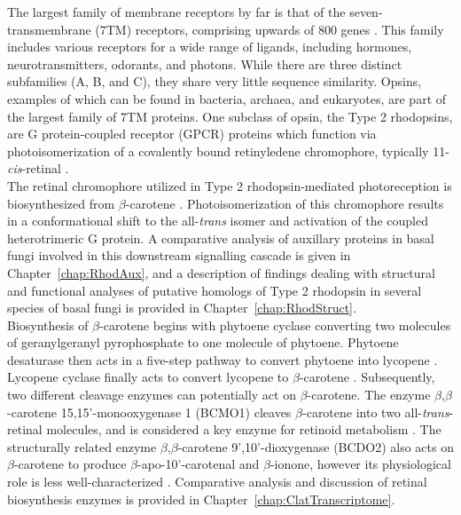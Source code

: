 \indent The largest family of membrane receptors by far is that of the seven-transmembrane (7TM) receptors, comprising upwards of 800 genes \cite{Pierce2002}. This family includes various receptors for a wide range of ligands, including hormones, neurotransmitters, odorants, and photons. While there are three distinct subfamilies (A, B, and C), they share very little sequence similarity. Opsins, examples of which can be found in bacteria, archaea, and eukaryotes, are part of the largest family of 7TM proteins. One subclass of opsin, the Type 2 rhodopsins, are G protein-coupled receptor (GPCR) proteins which function via photoisomerization of a covalently bound retinyledene chromophore, typically 11-\textit{cis}-retinal \cite{Wald1968}.\\
\indent The retinal chromophore utilized in Type 2 rhodopsin-mediated photoreception is biosynthesized from $\beta$-carotene \cite{VonLintig2000}. Photoisomerization of this chromophore results in a conformational shift to the all-\textit{trans} isomer \cite{Smith2010} and activation of the coupled heterotrimeric G protein. A comparative analysis of auxillary proteins in basal fungi involved in this downstream signalling cascade is given in Chapter~\ref{chap:RhodAux}, and a description of findings dealing with structural and functional analyses of putative homologs of Type 2 rhodopsin in several species of basal fungi is provided in Chapter~\ref{chap:RhodStruct}.\\
\indent Biosynthesis of $\beta$-carotene begins with phytoene cyclase
converting two molecules of geranylgeranyl pyrophosphate to one
molecule of phytoene. Phytoene desaturase then acts in a five-step pathway to convert phytoene into lycopene \cite{Hausmann2000}. Lycopene cyclase finally acts to convert lycopene to $\beta$-carotene \cite{Cunningham1994}. Subsequently, two different cleavage enzymes can potentially act on $\beta$-carotene. The enzyme $\beta$,$\beta$-carotene 15,15'-monooxygenase 1 (BCMO1) cleaves $\beta$-carotene into two all-\textit{trans}-retinal molecules, and is considered a key enzyme for retinoid metabolism \cite{Lietz2012}. The structurally related enzyme $\beta$,$\beta$-carotene 9',10'-dioxygenase (BCDO2) also acts on $\beta$-carotene to produce $\beta$-apo-10'-carotenal and $\beta$-ionone, however its physiological role is less well-characterized \cite{Lobo2012}. Comparative analysis and discussion of retinal biosynthesis enzymes is provided in Chapter~\ref{chap:ClatTranscriptome}.\\
